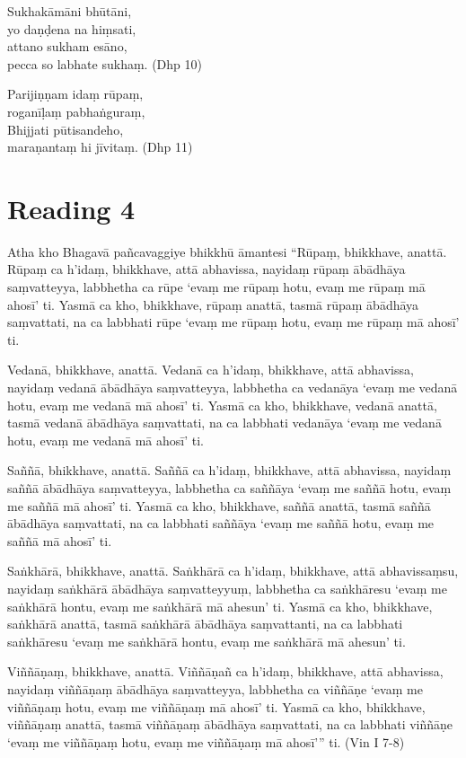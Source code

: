 Sukhakāmāni bhūtāni,\\
yo daṇḍena na hiṃsati,\\
attano sukham esāno,\\
pecca so labhate sukhaṃ. (Dhp 10)

Parijiṇṇam idaṃ rūpaṃ,\\
roganīḷaṃ pabhaṅguraṃ,\\
Bhijjati pūtisandeho,\\
maraṇantaṃ hi jīvitaṃ. (Dhp 11)

\section*{Reading 4}

Atha kho Bhagavā pañcavaggiye bhikkhū āmantesi “Rūpaṃ, bhikkhave, anattā. Rūpaṃ ca h’idaṃ, bhikkhave, attā abhavissa, nayidaṃ rūpaṃ ābādhāya saṃvatteyya, labbhetha ca rūpe ‘evaṃ me rūpaṃ hotu, evaṃ me rūpaṃ mā ahosī’ ti. Yasmā ca kho, bhikkhave, rūpaṃ anattā, tasmā rūpaṃ ābādhāya saṃvattati, na ca labbhati rūpe ‘evaṃ me rūpaṃ hotu, evaṃ me rūpaṃ mā ahosī’ ti.

Vedanā, bhikkhave, anattā. Vedanā ca h’idaṃ, bhikkhave, attā abhavissa, nayidaṃ vedanā ābādhāya saṃvatteyya, labbhetha ca vedanāya ‘evaṃ me vedanā hotu, evaṃ me vedanā mā ahosī’ ti. Yasmā ca kho, bhikkhave, vedanā anattā, tasmā vedanā ābādhāya saṃvattati, na ca labbhati vedanāya ‘evaṃ me vedanā hotu, evaṃ me vedanā mā ahosī’ ti.

Saññā, bhikkhave, anattā. Saññā ca h’idaṃ, bhikkhave, attā abhavissa, nayidaṃ saññā ābādhāya saṃvatteyya, labbhetha ca saññāya ‘evaṃ me saññā hotu, evaṃ me saññā mā ahosī’ ti. Yasmā ca kho, bhikkhave, saññā anattā, tasmā saññā ābādhāya saṃvattati, na ca labbhati saññāya ‘evaṃ me saññā hotu, evaṃ me saññā mā ahosī’ ti.

Saṅkhārā, bhikkhave, anattā. Saṅkhārā ca h’idaṃ, bhikkhave, attā abhavissaṃsu, nayidaṃ saṅkhārā ābādhāya saṃvatteyyuṃ, labbhetha ca saṅkhāresu ‘evaṃ me saṅkhārā hontu, evaṃ me saṅkhārā mā ahesun’ ti. Yasmā ca kho, bhikkhave, saṅkhārā anattā, tasmā saṅkhārā ābādhāya saṃvattanti, na ca labbhati saṅkhāresu ‘evaṃ me saṅkhārā hontu, evaṃ me saṅkhārā mā ahesun’ ti.

Viññāṇaṃ, bhikkhave, anattā. Viññāṇañ ca h’idaṃ, bhikkhave, attā abhavissa, nayidaṃ viññāṇaṃ ābādhāya saṃvatteyya, labbhetha ca viññāṇe ‘evaṃ me viññāṇaṃ hotu, evaṃ me viññāṇaṃ mā ahosī’ ti. Yasmā ca kho, bhikkhave, viññāṇaṃ anattā, tasmā viññāṇaṃ ābādhāya saṃvattati, na ca labbhati viññāṇe ‘evaṃ me viññāṇaṃ hotu, evaṃ me viññāṇaṃ mā ahosī’” ti. (Vin I 7-8)

